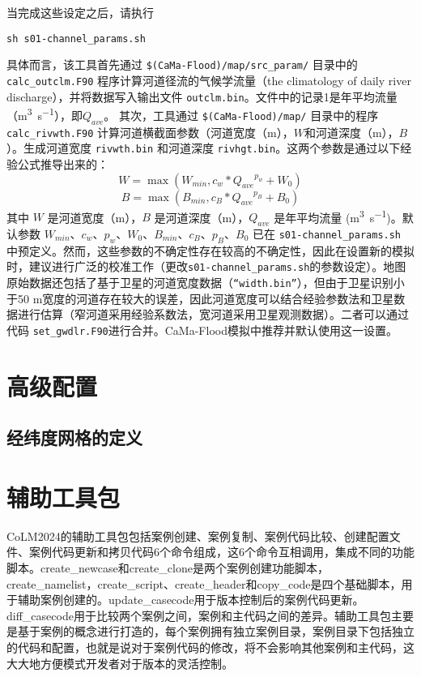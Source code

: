 \documentclass[a4paper,12pt,twoside]{article}
\begin{document}
\begin{enumerate}
当完成这些设定之后，请执行 
\begin{lstlisting}
sh s01-channel_params.sh
\end{lstlisting}
具体而言，该工具首先通过 \texttt{\$(CaMa-Flood)/map/src\_param/} 目录中的 \texttt{calc\allowbreak\_outclm\allowbreak.F90} 程序计算河道径流的气候学流量（the climatology of daily river discharge），并将数据写入输出文件 \texttt{outclm.bin}。文件中的记录1是年平均流量（\unit{m^3.s^{-1}}），即$Q_{ave}$。 其次，工具通过 \texttt{\$(CaMa-Flood)/map/} 目录中的程序 \texttt{calc\_rivwth.F90} 计算河道横截面参数（河道宽度（m），$W$和河道深度（m），$B$）。生成河道宽度 \texttt{rivwth.bin} 和河道深度 \texttt{rivhgt.bin}。这两个参数是通过以下经验公式推导出来的：
\begin{equation}
W=\max(W_{min},c_w\ast{Q_{ave}}^{p_w}+W_0)
\end{equation}
\begin{equation}
B=\max(B_{min},c_B\ast{Q_{ave}}^{p_B}+B_0)
\end{equation}
其中 $W$ 是河道宽度（m），$B$ 是河道深度（m），$Q_{ave}$ 是年平均流量 (\unit{m^3.s^{-1}})。默认参数 $W_{min}$、$c_w$、$p_w$、$W_0$、$B_{min}$、$c_B$、$p_B$、$B_0$ 已在 \texttt{s01-channel\_params.sh} 中预定义。然而，这些参数的不确定性存在较高的不确定性，因此在设置新的模拟时，建议进行广泛的校准工作（更改\texttt{s01-channel\_params.sh}的参数设定）。地图原始数据还包括了基于卫星的河道宽度数据（\texttt{“width.bin”}），但由于卫星识别小于50 m宽度的河道存在较大的误差，因此河道宽度可以结合经验参数法和卫星数据进行估算（窄河道采用经验系数法，宽河道采用卫星观测数据）。二者可以通过代码 \texttt{set\_gwdlr.F90}进行合并。CaMa-Flood模拟中推荐并默认使用这一设置。
 

\end{enumerate}


\section{高级配置}
\subsection{经纬度网格的定义}

\section{辅助工具包}
CoLM2024的辅助工具包包括案例创建、案例复制、案例代码比较、创建配置文件、案例代码更新和拷贝代码6个命令组成，这6个命令互相调用，集成不同的功能脚本。create\_newcase和create\_clone是两个案例创建功能脚本，create\_namelist，create\_script、create\_header和copy\_code是四个基础脚本，用于辅助案例创建的。update\_casecode用于版本控制后的案例代码更新。diff\_casecode用于比较两个案例之间，案例和主代码之间的差异。辅助工具包主要是基于案例的概念进行打造的，每个案例拥有独立案例目录，案例目录下包括独立的代码和配置，也就是说对于案例代码的修改，将不会影响其他案例和主代码，这大大地方便模式开发者对于版本的灵活控制。
\end{document}
